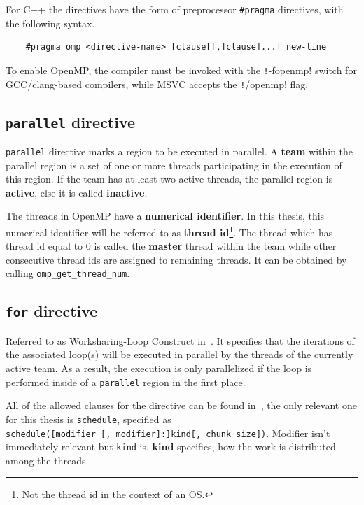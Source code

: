 \documentclass[thesis=M,english]{FITthesis}[2019/12/23]
\newcommand{\csre}[1]{\texttt!#1!}
\begin{document}
For C++ the directives have the form of preprocessor \texttt{\#pragma} directives, with the following
syntax.
\begin{verbatim}
    #pragma omp <directive-name> [clause[[,]clause]...] new-line
\end{verbatim}

To enable OpenMP, the compiler must be invoked with the \csre{-fopenmp}
switch for GCC/clang-based compilers, while MSVC accepts the \csre{/openmp} flag.

\subsection{\texttt{parallel} directive}

\texttt{parallel} directive marks a region to be executed in parallel. A \textbf{team} within the parallel
region is a set of one or more threads participating in the execution of this region. If the team has at
least two active threads, the parallel region is \textbf{active}, else it is called \textbf{inactive}.

The threads in OpenMP have a \textbf{numerical identifier}. In this thesis, this numerical identifier will be
referred to as \textbf{thread id}\footnote{Not the thread id in the context of an OS.}.
The thread which has thread id equal to 0 is called the \textbf{master}
thread within the team while other consecutive thread ids are assigned to remaining threads.
It can be obtained by calling \texttt{omp_get_thread_num}.

\subsection{\texttt{for} directive}

Referred to as Worksharing-Loop Construct in~\cite{openmp18}. It specifies that the iterations
of the associated loop(s) will be executed in parallel by the threads of the currently active
team. As a result, the execution is only parallelized if the loop is performed inside of a
\texttt{parallel} region in the first place.

All of the allowed clauses for the directive can be found in~\cite{openmp18}, the only relevant one
for this thesis is \texttt{schedule}, specified as \\
\texttt{schedule([modifier [, modifier]:]kind[, chunk\_size])}. Modifier isn't immediately relevant
but \texttt{kind} is. \textbf{kind} specifies, how the work is distributed among the threads.
\end{document}

